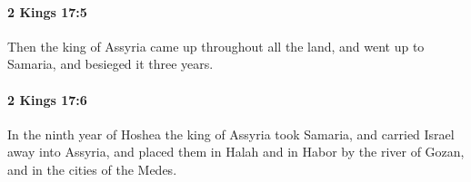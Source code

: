 		\paragraph{2 Kings 17:5} %
			\label{2KINGS-17-5}

			Then the king of Assyria came up throughout all the land, and went up to Samaria, and besieged it three years.


		\paragraph{2 Kings 17:6} %
			\label{2KINGS-17-6}

			In the ninth year of Hoshea the king of Assyria took Samaria, and carried Israel away into Assyria, and placed them in Halah and in Habor by the river of Gozan, and in the cities of the Medes.


